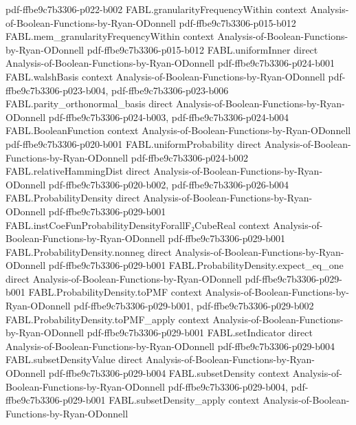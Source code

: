 \begin{theorem}
{    pdf-ffbe9c7b3306-p022-b002}
\proofstep
  {FABL.granularityFrequencyWithin}
  {context}
  {Analysis-of-Boolean-Functions-by-Ryan-ODonnell}
  {pdf-ffbe9c7b3306-p015-b012}
\proofstep
  {FABL.mem_granularityFrequencyWithin}
  {context}
  {Analysis-of-Boolean-Functions-by-Ryan-ODonnell}
  {pdf-ffbe9c7b3306-p015-b012}
\proofstep
  {FABL.uniformInner}
  {direct}
  {Analysis-of-Boolean-Functions-by-Ryan-ODonnell}
  {pdf-ffbe9c7b3306-p024-b001}
\proofstep
  {FABL.walshBasis}
  {context}
  {Analysis-of-Boolean-Functions-by-Ryan-ODonnell}
  {pdf-ffbe9c7b3306-p023-b004,
    pdf-ffbe9c7b3306-p023-b006}
\proofstep
  {FABL.parity_orthonormal_basis}
  {direct}
  {Analysis-of-Boolean-Functions-by-Ryan-ODonnell}
  {pdf-ffbe9c7b3306-p024-b003,
    pdf-ffbe9c7b3306-p024-b004}
\proofstep
  {FABL.BooleanFunction}
  {context}
  {Analysis-of-Boolean-Functions-by-Ryan-ODonnell}
  {pdf-ffbe9c7b3306-p020-b001}
\proofstep
  {FABL.uniformProbability}
  {direct}
  {Analysis-of-Boolean-Functions-by-Ryan-ODonnell}
  {pdf-ffbe9c7b3306-p024-b002}
\proofstep
  {FABL.relativeHammingDist}
  {direct}
  {Analysis-of-Boolean-Functions-by-Ryan-ODonnell}
  {pdf-ffbe9c7b3306-p020-b002,
    pdf-ffbe9c7b3306-p026-b004}
\proofstep
  {FABL.ProbabilityDensity}
  {direct}
  {Analysis-of-Boolean-Functions-by-Ryan-ODonnell}
  {pdf-ffbe9c7b3306-p029-b001}
\proofstep
  {FABL.instCoeFunProbabilityDensityForallF₂CubeReal}
  {context}
  {Analysis-of-Boolean-Functions-by-Ryan-ODonnell}
  {pdf-ffbe9c7b3306-p029-b001}
\proofstep
  {FABL.ProbabilityDensity.nonneg}
  {direct}
  {Analysis-of-Boolean-Functions-by-Ryan-ODonnell}
  {pdf-ffbe9c7b3306-p029-b001}
\proofstep
  {FABL.ProbabilityDensity.expect_eq_one}
  {direct}
  {Analysis-of-Boolean-Functions-by-Ryan-ODonnell}
  {pdf-ffbe9c7b3306-p029-b001}
\proofstep
  {FABL.ProbabilityDensity.toPMF}
  {context}
  {Analysis-of-Boolean-Functions-by-Ryan-ODonnell}
  {pdf-ffbe9c7b3306-p029-b001,
    pdf-ffbe9c7b3306-p029-b002}
\proofstep
  {FABL.ProbabilityDensity.toPMF_apply}
  {context}
  {Analysis-of-Boolean-Functions-by-Ryan-ODonnell}
  {pdf-ffbe9c7b3306-p029-b001}
\proofstep
  {FABL.setIndicator}
  {direct}
  {Analysis-of-Boolean-Functions-by-Ryan-ODonnell}
  {pdf-ffbe9c7b3306-p029-b004}
\proofstep
  {FABL.subsetDensityValue}
  {direct}
  {Analysis-of-Boolean-Functions-by-Ryan-ODonnell}
  {pdf-ffbe9c7b3306-p029-b004}
\proofstep
  {FABL.subsetDensity}
  {context}
  {Analysis-of-Boolean-Functions-by-Ryan-ODonnell}
  {pdf-ffbe9c7b3306-p029-b004,
    pdf-ffbe9c7b3306-p029-b001}
\proofstep
  {FABL.subsetDensity_apply}
  {context}
  {Analysis-of-Boolean-Functions-by-Ryan-ODonnell}

\end{theorem}

